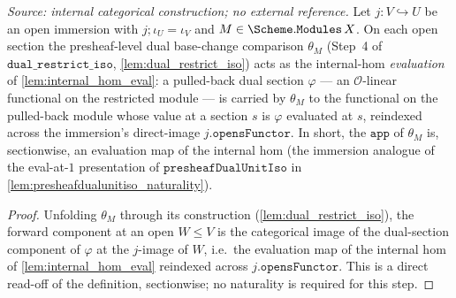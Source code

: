 \begin{lemma}
  \label{lem:presheafdual_pullback_comparison_eval_apply}
  \textit{Source: internal categorical construction; no external reference.}
  Let \(j : V \hookrightarrow U\) be an open immersion with \(j \mathbin{;} \iota_U = \iota_V\) and
  \(M \in \Scheme.\mathtt{Modules}\,X\). On each open section the presheaf-level dual base-change
  comparison \(\theta_M\) (Step~4 of \(\mathtt{dual\_restrict\_iso}\), \cref{lem:dual_restrict_iso})
  acts as the internal-hom \emph{evaluation} of \cref{lem:internal_hom_eval}: a pulled-back dual
  section \(\varphi\) --- an \(\mathcal{O}\)-linear functional on the restricted module --- is carried
  by \(\theta_M\) to the functional on the pulled-back module whose value at a section \(s\) is
  \(\varphi\) evaluated at \(s\), reindexed across the immersion's direct-image
  \(j.\mathtt{opensFunctor}\). In short, the \(\mathtt{app}\) of \(\theta_M\) is, sectionwise, an
  evaluation map of the internal hom (the immersion analogue of the eval-at-\(1\) presentation of
  \(\mathtt{presheafDualUnitIso}\) in \cref{lem:presheafdualunitiso_naturality}).
\end{lemma}
\begin{proof}
  Unfolding \(\theta_M\) through its construction (\cref{lem:dual_restrict_iso}), the forward
  component at an open \(W \le V\) is the categorical image of the dual-section component of
  \(\varphi\) at the \(j\)-image of \(W\), i.e.\ the evaluation map of the internal hom of
  \cref{lem:internal_hom_eval} reindexed across \(j.\mathtt{opensFunctor}\). This is a direct
  read-off of the definition, sectionwise; no naturality is required for this step.
\end{proof}

